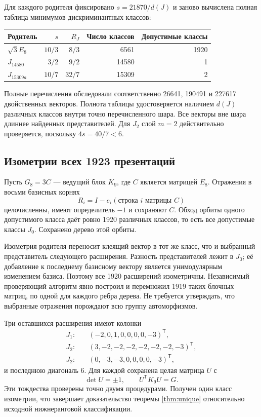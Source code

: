 \documentclass[11pt,a4paper]{article}
\theoremstyle{remark}\newtheorem{remark}[theorem]{Замечание}
\begin{document}
Для каждого родителя фиксировано $s=21870/d(J)$ и заново вычислена полная таблица минимумов дискриминантных классов:
\begin{center}
\begin{tabular}{lrrrr}
\toprule
Родитель &$s$&$R_J$&Число классов&Допустимые классы\\\midrule
$\sqrt3E_8$ &$10/3$&$8/3$&6561&1920\\
$J_{14580}$ &$3/2$&$9/2$&14580&1\\
$J_{15309a}$ &$10/7$&$32/7$&15309&2\\
\bottomrule
\end{tabular}
\end{center}
Полные перечисления обследовали соответственно 26641, 190491 и 227617 двойственных векторов. Полнота таблицы удостоверяется наличием $d(J)$ различных классов внутри точно перечисленного шара. Все векторы вне шара длиннее найденных представителей. Для $J_2$ слой $m=2$ действительно проверяется, поскольку $4s=40/7<6$.

\subsection{Изометрии всех 1923 презентаций}

Пусть $G_8=3C$ --- ведущий блок $K_9$, где $C$ является матрицей $E_8$. Отражения в восьми базисных корнях
\[
R_i=I-e_i(\text{строка }i\text{ матрицы }C)
\]
целочисленны, имеют определитель $-1$ и сохраняют $C$. Обход орбиты одного допустимого класса даёт ровно 1920 различных классов, то есть все допустимые классы $J_0$. Сохранено дерево этой орбиты.

Изометрия родителя переносит клеящий вектор в тот же класс, что и выбранный представитель следующего расширения. Разность представителей лежит в $J_0$; её добавление к последнему базисному вектору является унимодулярным изменением базиса. Поэтому все 1920 расширений изометричны. Независимый проверяющий алгоритм явно построил и перемножил 1919 таких блочных матриц, по одной для каждого ребра дерева. Не требуется утверждать, что выбранные отражения порождают всю группу автоморфизмов.

Три оставшихся расширения имеют колонки
\begin{align*}
J_1:&\quad(-2,0,1,0,0,0,0,-3)^{\mathsf T},\\
J_2:&\quad(3,-2,-2,-2,-2,-2,-2,-3)^{\mathsf T},\\
J_2:&\quad(0,-3,-3,0,0,0,0,-3)^{\mathsf T},
\end{align*}
и последнюю диагональ 6. Для каждой сохранена целая матрица $U$ с
\[
\det U=\pm1,\qquad U^{\mathsf T}K_9U=G.
\]
Эти тождества проверены точно двумя процедурами. Получен один класс изометрии, что завершает доказательство теоремы \ref{thm:unique} относительно исходной нижнеранговой классификации.
\end{document}
